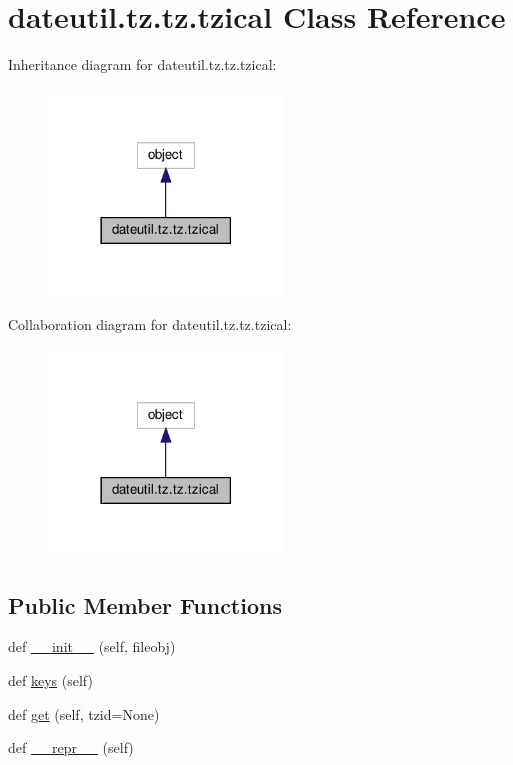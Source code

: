 \hypertarget{classdateutil_1_1tz_1_1tz_1_1tzical}{}\section{dateutil.\+tz.\+tz.\+tzical Class Reference}
\label{classdateutil_1_1tz_1_1tz_1_1tzical}


Inheritance diagram for dateutil.\+tz.\+tz.\+tzical\+:
\nopagebreak
\begin{figure}[H]
\begin{center}
\leavevmode
\includegraphics[width=177pt]{classdateutil_1_1tz_1_1tz_1_1tzical__inherit__graph}
\end{center}
\end{figure}


Collaboration diagram for dateutil.\+tz.\+tz.\+tzical\+:
\nopagebreak
\begin{figure}[H]
\begin{center}
\leavevmode
\includegraphics[width=177pt]{classdateutil_1_1tz_1_1tz_1_1tzical__coll__graph}
\end{center}
\end{figure}
\subsection*{Public Member Functions}
\begin{DoxyCompactItemize}
\item 
def \hyperlink{classdateutil_1_1tz_1_1tz_1_1tzical_ab63dc4cae6ef16d7c738c3cc56d8136b}{\+\_\+\+\_\+init\+\_\+\+\_\+} (self, fileobj)
\item 
def \hyperlink{classdateutil_1_1tz_1_1tz_1_1tzical_a90cbed637b2fe6f2340107910823efb4}{keys} (self)
\item 
def \hyperlink{classdateutil_1_1tz_1_1tz_1_1tzical_ae45347e1bed90941d4767d415dd66bb8}{get} (self, tzid=None)
\item 
def \hyperlink{classdateutil_1_1tz_1_1tz_1_1tzical_aafd14c1858e6721546e85648f1415899}{\+\_\+\+\_\+repr\+\_\+\+\_\+} (self)
\end{DoxyCompactItemize}


